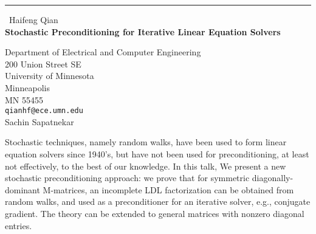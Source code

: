 \documentclass{report}
\begin{document}
\begin{center}
\rule{6in}{1pt} \
{\large Haifeng Qian \\
{\bf Stochastic Preconditioning for Iterative Linear Equation Solvers}}

Department of Electrical and Computer Engineering \\ 200 Union Street SE \\ University of Minnesota \\ Minneapolis \\ MN 55455
\\
{\tt qianhf@ece.umn.edu}\\
Sachin Sapatnekar\end{center}

Stochastic techniques, namely random walks, have been used to form linear
equation solvers since 1940's, but have not been used for
preconditioning, at least not effectively, to the best of our knowledge.
In this talk, We present a new stochastic preconditioning approach: we
prove that for symmetric diagonally-dominant M-matrices, an incomplete
LDL factorization can be obtained from random walks, and used as a
preconditioner for an iterative solver, e.g., conjugate gradient. The
theory can be extended to general matrices with nonzero diagonal entries.
\end{document}
